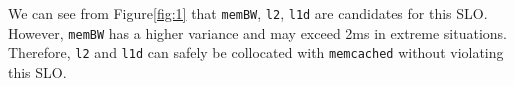 

We can  see from Figure\ref{fig:1} that \texttt{memBW}, \texttt{l2}, \texttt{l1d} are candidates for this SLO.
However, \texttt{memBW} has a higher variance and may exceed 2ms in extreme situations. 
Therefore, \texttt{l2} and \texttt{l1d} can safely be collocated
with \texttt{memcached} without violating this SLO.
